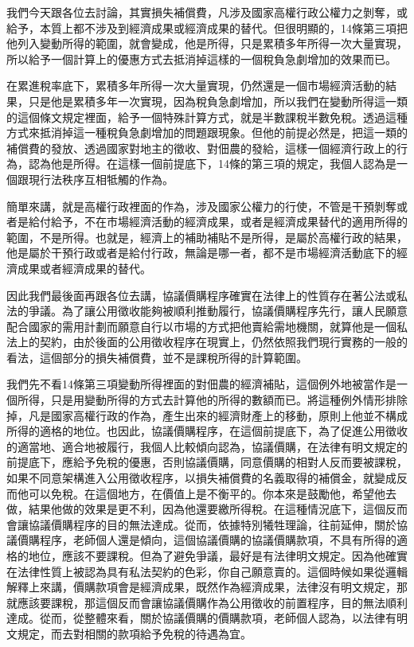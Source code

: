 \documentclass[oneside,sub3section]{ctexbook}
\begin{document}
我們今天跟各位去討論，其實損失補償費，凡涉及國家高權行政公權力之剝奪，或給予，本質上都不涉及到經濟成果或經濟成果的替代。但很明顯的，14條第三項把他列入變動所得的範圍，就會變成，他是所得，只是累積多年所得一次大量實現，所以給予一個計算上的優惠方式去抵消掉這樣的一個稅負急劇增加的效果而已。

在累進稅率底下，累積多年所得一次大量實現，仍然還是一個市場經濟活動的結果，只是他是累積多年一次實現，因為稅負急劇增加，所以我們在變動所得這一類的這個條文規定裡面，給予一個特殊計算方式，就是半數課稅半數免稅。透過這種方式來抵消掉這一種稅負急劇增加的問題跟現象。但他的前提必然是，把這一類的補償費的發放、透過國家對地主的徵收、對佃農的發給，這樣一個經濟行政上的行為，認為他是所得。在這樣一個前提底下，14條的第三項的規定，我個人認為是一個跟現行法秩序互相牴觸的作為。

簡單來講，就是高權行政裡面的作為，涉及國家公權力的行使，不管是干預剝奪或者是給付給予，不在市場經濟活動的經濟成果，或者是經濟成果替代的適用所得的範圍，不是所得。也就是，經濟上的補助補貼不是所得，是屬於高權行政的結果，他是屬於干預行政或者是給付行政，無論是哪一者，都不是市場經濟活動底下的經濟成果或者經濟成果的替代。

因此我們最後面再跟各位去講，協議價購程序確實在法律上的性質存在著公法或私法的爭議。為了讓公用徵收能夠被順利推動履行，協議價購程序先行，讓人民願意配合國家的需用計劃而願意自行以市場的方式把他賣給需地機關，就算他是一個私法上的契約，由於後面的公用徵收程序在現實上，仍然依照我們現行實務的一般的看法，這個部分的損失補償費，並不是課稅所得的計算範圍。

我們先不看14條第三項變動所得裡面的對佃農的經濟補貼，這個例外地被當作是一個所得，只是用變動所得的方式去計算他的所得的數額而已。將這種例外情形排除掉，凡是國家高權行政的作為，產生出來的經濟財產上的移動，原則上他並不構成所得的適格的地位。也因此，協議價購程序，在這個前提底下，為了促進公用徵收的適當地、適合地被履行，我個人比較傾向認為，協議價購，在法律有明文規定的前提底下，應給予免稅的優惠，否則協議價購，同意價購的相對人反而要被課稅，如果不同意架構進入公用徵收程序，以損失補償費的名義取得的補償金，就變成反而他可以免稅。在這個地方，在價值上是不衡平的。你本來是鼓勵他，希望他去做，結果他做的效果是更不利，因為他還要繳所得稅。在這種情況底下，這個反而會讓協議價購程序的目的無法達成。從而，依據特別犧牲理論，往前延伸，關於協議價購程序，老師個人還是傾向，這個協議價購的協議價購款項，不具有所得的適格的地位，應該不要課稅。但為了避免爭議，最好是有法律明文規定。因為他確實在法律性質上被認為具有私法契約的色彩，你自己願意賣的。這個時候如果從邏輯解釋上來講，價購款項會是經濟成果，既然作為經濟成果，法律沒有明文規定，那就應該要課稅，那這個反而會讓協議價購作為公用徵收的前置程序，目的無法順利達成。從而，從整體來看，關於協議價購的價購款項，老師個人認為，以法律有明文規定，而去對相關的款項給予免稅的待遇為宜。
\end{document}
